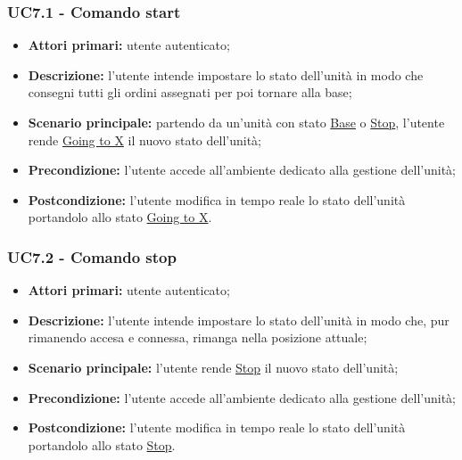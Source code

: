         \subsubsection{UC7.1 - Comando start}
        \begin{itemize}
            \item \textbf{Attori primari:} utente autenticato;
            \item \textbf{Descrizione:} l'utente intende impostare lo stato dell'unità in modo che consegni tutti gli ordini assegnati per poi tornare alla base;
            \item \textbf{Scenario principale:} partendo da un'unità con stato \underline{Base} o \underline{Stop}, l'utente rende \underline{Going to X} il nuovo stato dell'unità;
            \item \textbf{Precondizione:} l'utente accede all'ambiente dedicato alla gestione dell'unità;
            \item \textbf{Postcondizione:} l'utente modifica in tempo reale lo stato dell'unità portandolo allo stato \underline{Going to X}.
        \end{itemize}

        \subsubsection{UC7.2 - Comando stop}
        \begin{itemize}
            \item \textbf{Attori primari:} utente autenticato;
            \item \textbf{Descrizione:} l'utente intende impostare lo stato dell'unità in modo che, pur rimanendo accesa e connessa, rimanga nella posizione attuale;
            \item \textbf{Scenario principale:} l'utente rende \underline{Stop} il nuovo stato dell'unità;
            \item \textbf{Precondizione:} l'utente accede all'ambiente dedicato alla gestione dell'unità;
            \item \textbf{Postcondizione:} l'utente modifica in tempo reale lo stato dell'unità portandolo allo stato \underline{Stop}.
        \end{itemize}

